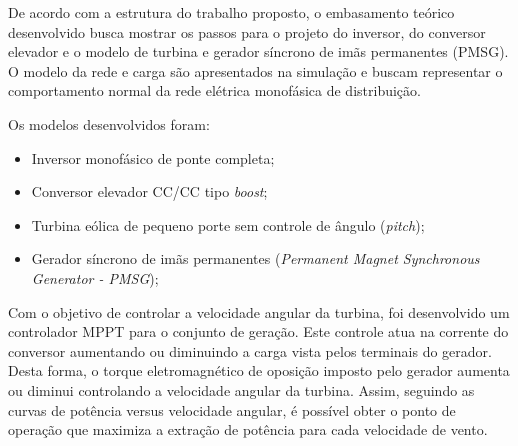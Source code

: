 
De acordo com a estrutura do trabalho proposto, o embasamento teórico desenvolvido busca mostrar os passos para o projeto do inversor, do conversor  elevador e o modelo de turbina e gerador síncrono de imãs permanentes (PMSG). O modelo da rede e carga são apresentados na simulação e buscam representar o comportamento normal da rede elétrica monofásica de distribuição.

Os modelos desenvolvidos foram:

\begin{itemize}
    \item Inversor monofásico de ponte completa;
    \item Conversor elevador CC/CC tipo \textit{boost};
    \item Turbina eólica de pequeno porte sem controle de ângulo (\textit{pitch});
    \item Gerador síncrono de imãs permanentes (\textit{Permanent Magnet Synchronous Generator - PMSG});
\end{itemize}

Com o objetivo de controlar a velocidade angular da turbina, foi desenvolvido um controlador MPPT para o conjunto de geração. Este controle atua na corrente do conversor aumentando ou diminuindo a carga vista pelos terminais do gerador. Desta forma, o torque eletromagnético de oposição imposto pelo gerador aumenta ou diminui controlando a velocidade angular da turbina. Assim, seguindo as curvas de potência versus velocidade angular, é possível obter o ponto de operação que maximiza a extração de potência para cada velocidade de vento.




